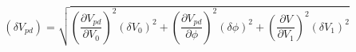 \begin{equation}
\label{eq:deltaV}
\left(\delta V_{pd}\right) = \sqrt{\left( \frac{\partial{V_{pd}}}{\partial{V_0}}\right)^2 (\delta V_0)^2 + \left( \frac{\partial{V_{pd}}}{\partial{\phi}}\right)^2 (\delta \phi)^2 + \left( \frac{\partial{V}}{\partial{V_1}}\right)^2 (\delta V_1)^2}
\end{equation}